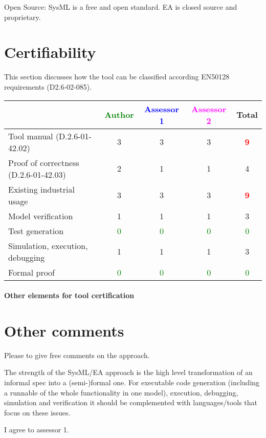 \begin{assessor2}
Open Source: SysML is a free and open standard. EA is closed source and proprietary.

\end{assessor2}


\section{Certifiability}

This section discusses how the tool can be classified according EN50128 requirements (D2.6-02-085).


\begin{tabular}{|l | c | c | c | c|}
\hline
& \textcolor{green}{Author} & \textcolor{blue}{Assessor 1} & \textcolor{magenta}{Assessor 2} & Total \\
\hline 
Tool manual (D.2.6-01-42.02) &3 & 3   &3 & \textcolor{red}{\textbf{9}} \\
\hline
Proof of correctness (D.2.6-01-42.03)   &2 & 1   & 1   & 4    \\
\hline
Existing industrial  usage  &3 & 3   &3 & \textcolor{red}{\textbf{9}} \\
\hline
Model verification &1 & 1   & 1   & 3     \\
\hline
Test generation & \textcolor{green}{0}   & \textcolor{green}{0} & \textcolor{green}{0} & \textcolor{green}{0} \\
\hline
Simulation, execution, debugging &1 & 1   &1 & 3    \\
\hline
Formal proof & \textcolor{green}{0}   & \textcolor{green}{0} & \textcolor{green}{0} & \textcolor{green}{0} \\
\hline
\end{tabular}

\paragraph{Other elements for tool certification}

\section{Other comments}
Please to  give free comments on the approach.

\begin{assessor1}
The strength of the SysML/EA approach is the high level transformation of an informal spec into a (semi-)formal one. 
For executable code generation (including a runnable of the whole functionality in one model), execution, debugging, simulation and verification it should be complemented with languages/tools that focus on these issues.
\end{assessor1}

\begin{assessor2}
I agree to assessor 1.
\end{assessor2}


